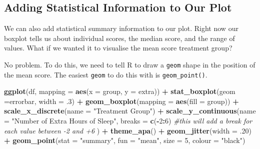 \documentclass[
]{book}
\newenvironment{Shaded}{\begin{snugshade}}{\end{snugshade}}
\newcommand{\AttributeTok}[1]{\textcolor[rgb]{0.13,0.29,0.53}{#1}}
\newcommand{\CommentTok}[1]{\textcolor[rgb]{0.56,0.35,0.01}{\textit{#1}}}
\newcommand{\DecValTok}[1]{\textcolor[rgb]{0.00,0.00,0.81}{#1}}
\newcommand{\FunctionTok}[1]{\textcolor[rgb]{0.13,0.29,0.53}{\textbf{#1}}}
\newcommand{\NormalTok}[1]{#1}
\newcommand{\SpecialCharTok}[1]{\textcolor[rgb]{0.81,0.36,0.00}{\textbf{#1}}}
\newcommand{\StringTok}[1]{\textcolor[rgb]{0.31,0.60,0.02}{#1}}
\begin{document}
\subsection{Adding Statistical Information to Our Plot}\label{adding-statistical-information-to-our-plot}

We can also add statistical summary information to our plot. Right now our boxplot tells us about individual scores, the median score, and the range of values. What if we wanted it to visualise the mean score treatment group?

No problem. To do this, we need to tell R to draw a \texttt{geom} shape in the position of the mean score. The easiest \texttt{geom} to do this with is \texttt{geom\_point()}.

\begin{Shaded}
\begin{Highlighting}[]
\FunctionTok{ggplot}\NormalTok{(df, }\AttributeTok{mapping =} \FunctionTok{aes}\NormalTok{(}\AttributeTok{x =}\NormalTok{ group, }\AttributeTok{y =}\NormalTok{ extra)) }\SpecialCharTok{+} 
  \FunctionTok{stat\_boxplot}\NormalTok{(}\AttributeTok{geom =}\StringTok{\textquotesingle{}errorbar\textquotesingle{}}\NormalTok{, }\AttributeTok{width =}\NormalTok{ .}\DecValTok{3}\NormalTok{) }\SpecialCharTok{+}
  \FunctionTok{geom\_boxplot}\NormalTok{(}\AttributeTok{mapping =} \FunctionTok{aes}\NormalTok{(}\AttributeTok{fill =}\NormalTok{ group)) }\SpecialCharTok{+} 
  \FunctionTok{scale\_x\_discrete}\NormalTok{(}\AttributeTok{name =} \StringTok{"Treatment Group"}\NormalTok{) }\SpecialCharTok{+} 
  \FunctionTok{scale\_y\_continuous}\NormalTok{(}\AttributeTok{name =} \StringTok{"Number of Extra Hours of Sleep"}\NormalTok{, }
                     \AttributeTok{breaks =} \FunctionTok{c}\NormalTok{(}\SpecialCharTok{{-}}\DecValTok{2}\SpecialCharTok{:}\DecValTok{6}\NormalTok{) }\CommentTok{\#this will add a break for each value between {-}2 and +6}
\NormalTok{                     ) }\SpecialCharTok{+}
  \FunctionTok{theme\_apa}\NormalTok{() }\SpecialCharTok{+}
  \FunctionTok{geom\_jitter}\NormalTok{(}\AttributeTok{width =}\NormalTok{ .}\DecValTok{20}\NormalTok{) }\SpecialCharTok{+}
  \FunctionTok{geom\_point}\NormalTok{(}\AttributeTok{stat =} \StringTok{"summary"}\NormalTok{, }\AttributeTok{fun =} \StringTok{"mean"}\NormalTok{, }\AttributeTok{size =} \DecValTok{5}\NormalTok{, }\AttributeTok{colour =} \StringTok{"black"}\NormalTok{) }
\end{Highlighting}
\end{Shaded}
\end{document}
